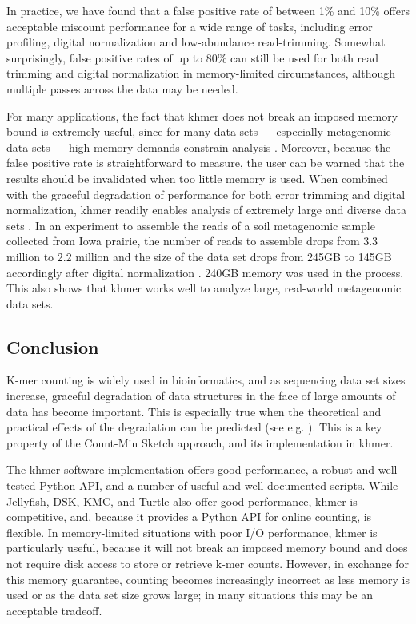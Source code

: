 In practice, we have found that a false positive rate of between 1\%
and 10\% offers acceptable miscount performance for a wide range of
tasks, including error profiling, digital normalization and
low-abundance read-trimming.  Somewhat surprisingly, false positive rates of up
to 80\% can still be used for both read trimming and digital
normalization in memory-limited circumstances, although multiple
passes across the data may be needed.

For many applications, the fact that khmer does not break an imposed
memory bound is extremely useful, since for many data sets ---
especially metagenomic data sets --- high memory demands constrain
analysis \cite{Howe2012,Luo2009}.  Moreover, because the false
positive rate is straightforward to measure, the user can be warned
that the results should be invalidated when too little memory is used.
When combined with the graceful degradation of performance for both
error trimming and digital normalization, khmer readily enables
analysis of extremely large and diverse data sets \cite{adina2013}. In
an experiment to assemble the reads of a soil metagenomic sample
collected from Iowa prairie, the number of reads to assemble drops
from 3.3 million to 2.2 million and the size of the data set drops from
245GB to 145GB accordingly after digital normalization
\cite{Howe2012}.  240GB memory was used in the process. This also
shows that khmer works well to analyze large, real-world metagenomic data
sets.

\subsection{Conclusion}

K-mer counting is widely used in bioinformatics, and as sequencing
data set sizes increase, graceful degradation of data structures in
the face of large amounts of data has become important.  This is
especially true when the theoretical and practical effects of the
degradation can be predicted (see e.g. \cite{Melsted2011, Pell2012,
  Roy2014}).  This is a key property of the Count-Min Sketch approach,
and its implementation in khmer.

The khmer software implementation offers good performance, a robust
and well-tested Python API, and a number of useful and well-documented
scripts.  While Jellyfish, DSK, KMC, and Turtle also offer good
performance, khmer is competitive, and, because it provides a Python
API for online counting, is flexible.  In memory-limited situations
with poor I/O performance, khmer is particularly useful, because it
will not break an imposed memory bound and does not require disk
access to store or retrieve k-mer counts.  However, in exchange for
this memory guarantee, counting becomes increasingly incorrect as less
memory is used or as the data set size grows large; in many situations
this may be an acceptable tradeoff.


